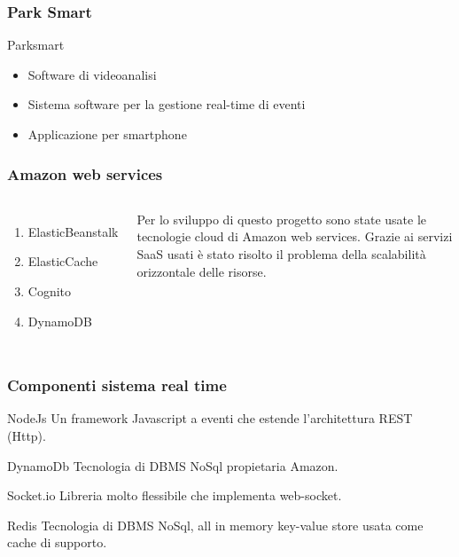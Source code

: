 \documentclass{beamer}
\begin{document}
\begin{frame}
\frametitle{Park Smart}
Parksmart 
\begin{itemize}
\item Software di videoanalisi
\item Sistema software per la gestione real-time di eventi
\item Applicazione per smartphone
\end{itemize}
\end{frame}


\begin{frame}
\frametitle{Amazon web services}
\begin{columns}[c] 


\begin{enumerate}
\item ElasticBeanstalk
\item ElasticCache
\item Cognito
\item DynamoDB
\end{enumerate}

Per lo sviluppo di questo progetto sono state usate le tecnologie cloud di Amazon web services. Grazie ai servizi SaaS usati \`e stato risolto il problema della scalabilit\`a orizzontale delle risorse.

\end{columns}
\end{frame}



\begin{frame}
\frametitle{Componenti sistema real time}
\begin{block}{NodeJs}
Un framework Javascript a eventi che estende l'architettura REST (Http). 
\end{block}

\begin{block}{DynamoDb}
Tecnologia di DBMS NoSql propietaria Amazon.
\end{block}

\begin{block}{Socket.io}
Libreria molto flessibile che implementa web-socket.
\end{block}

\begin{block}{Redis}
Tecnologia di DBMS NoSql, all in memory key-value store usata come cache di supporto.
\end{block}
\end{frame}
\end{document}
